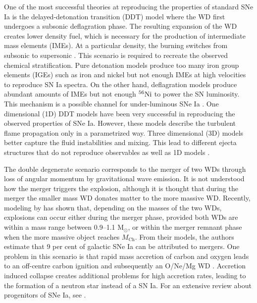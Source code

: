 \documentclass[useAMS,usenatbib,useasmath]{mnras}
\newcommand{\Mch}{\hbox{$M_{\text{Ch}}$}}
\newcommand{\elem}[2][default]{$^{#1}{\rm #2}$}
\begin{document}
One of the most successful theories at reproducing the properties of standard SNe Ia is the delayed-detonation transition (DDT) model where the WD first undergoes a subsonic deflagration phase. The resulting expansion of the WD creates lower density fuel, which is necessary for the production of intermediate mass elements (IMEs). At a particular density, the burning switches from subsonic to supersonic \citep{Khokhlov1991a,Khokhlov1991b}. This scenario is required to recreate the observed chemical stratification. Pure detonation models produce too many iron group elements (IGEs) such as iron and nickel but not enough IMEs at high velocities to reproduce SN Ia spectra. On the other hand, deflagration models produce abundant amounts of IMEs but not enough \elem[56]{Ni} to power the SN luminosity. This mechanism is a possible channel for under-luminous SNe Ia \citep{Travaglio2004,Phillips2007,Jordan2012,Kromer2013}.
One dimensional (1D) DDT models have been  very successful in reproducing the observed properties of SNe Ia. However, these models describe the turbulent flame propagation only in a parametrized way. Three dimensional (3D) models better capture the fluid instabilities and mixing. This lead to different ejecta structures that do not reproduce observables as well as 1D models \citep[see e.g.][]{Seitenzahl2013,Sim2013MNRAS}.

The double degenerate scenario corresponds to the merger of two WDs through loss of angular momentum by gravitational wave emission. It is not understood how the merger triggers the explosion, although it is thought that during the merger the smaller mass WD donates matter to the more massive WD. Recently, modeling by \cite{Sato2015} has shown that, depending on the masses of the two WDs, explosions can occur either during the merger phase, provided both WDs are within a mass range between 0.9--1.1 M$_\odot$, or within the merger remnant phase when the more massive object reaches \Mch. From their models, the authors estimate that 9 per cent of galactic SNe Ia can be attributed to mergers. One problem in this scenario is that rapid mass accretion  of carbon and oxygen leads to an off-centre carbon ignition and subsequently an O/Ne/Mg WD \citep{Saio_Nomoto1985}. Accretion induced collapse creates additional problems for high accretion rates, leading to the formation of a neutron star instead of a SN Ia. For an extensive review about progenitors of SNe Ia, see \cite{Maoz2014}.
\end{document}
